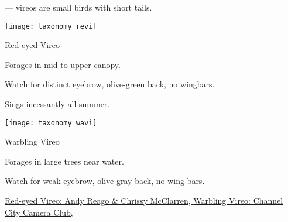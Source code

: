 \documentclass[t]{beamer}
\newcommand{\backoneline}{\vspace{-\baselineskip}}
\begin{document}
\begin{frame}{ — vireos are small birds with short tails.}

\backoneline
	\begin{multicols}{2}
		
		\texttt{[image: taxonomy\_revi]}
		
		Red-eyed Vireo
		
		\medskip
		
		Forages in mid to upper canopy.
		
		\smallskip
		
		Watch for distinct eyebrow, olive-green back, no wingbars.
		
		\smallskip
	
		Sings incessantly all summer.
	
		\columnbreak
		
		\texttt{[image: taxonomy\_wavi]}
		
		Warbling Vireo
	
		\medskip
			
		Forages in large trees near water.
		
		\smallskip
		
		Watch for weak eyebrow,  olive-gray back, no wing bars.
		
		\smallskip
		
		\phantom{stuff}
		
	\end{multicols}
	
	\vfilll
	
	\tiny \href{https://flickr.com/photos/wildreturn/48905242882}{Red-eyed Vireo: Andy Reago \& Chrissy McClarren, } \hfill  \href{https://flickr.com/photos/135081788@N03/51501843041}{Warbling Vireo: Channel City Camera Club, }
		
\end{frame}
\end{document}
